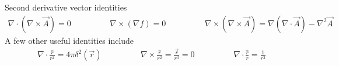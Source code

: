 Second derivative vector identities
\begin{align}
	\nabla \cdot (\nabla \times \vec{A}) =0 \hspace{2cm} \nabla \times (\nabla f)=0 \hspace{2cm}
	\nabla \times (\nabla \times \vec{A}) = \nabla (\nabla \cdot \vec{A})- \nabla^2\vec{A}
\end{align}
A few other useful identities include
\begin{align}
	\nabla \cdot \frac{\hat{r}}{r^2} = 4\pi\delta^2(\vec{r}) \hspace{2cm}\nabla \times \frac{\hat{r}}{r^2} =\frac{\vec{r}}{r^3}= 0 \hspace{2cm} \nabla \cdot \frac{\hat{r}}{r} = \frac{1}{r^2}
\end{align}